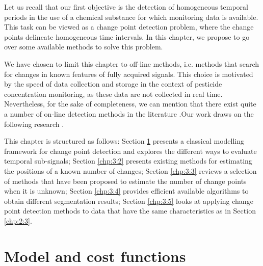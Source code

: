 Let us recall that our first objective is the detection of homogeneous temporal periods in the use of a chemical substance for which monitoring data is available. This task can be viewed as a change point detection problem, where the change points delineate homogeneous time intervals. In this chapter, we propose to go over some available methods to solve this problem.  

We have chosen to limit this chapter to off-line methods, i.e. methods that search for changes in known features of fully acquired signals. This choice is motivated by the speed of data collection and storage in the context of pesticide concentration monitoring, as these data are not collected in real time. Nevertheless, for the sake of completeness, we can mention that there exist quite a number of on-line detection methods in the literature \citep{liu2017change,Li2021,hohle2010online,ranganathan2010pliss,li2015m}.Our work draws on the following research \citep{truong2020,basseville1993detection,bardet2020}. 

This chapter is structured as follows: Section \ref{chp:3:1} presents a classical modelling framework for change point detection and explores the different ways to evaluate temporal sub-signals; Section \ref{chp:3:2} presents existing methods for estimating the positions of a known number of changes; Section \ref{chp:3:3} reviews a selection of methods that have been proposed to estimate the number of change points when it is unknown; Section \ref{chp:3:4} provides efficient available algorithms to obtain different segmentation results; Section \ref{chp:3:5} looks at applying change point detection methods to data that have the same characteristics as in Section \ref{chp:2:3}.

\section{Model and cost functions}\label{chp:3:1}


